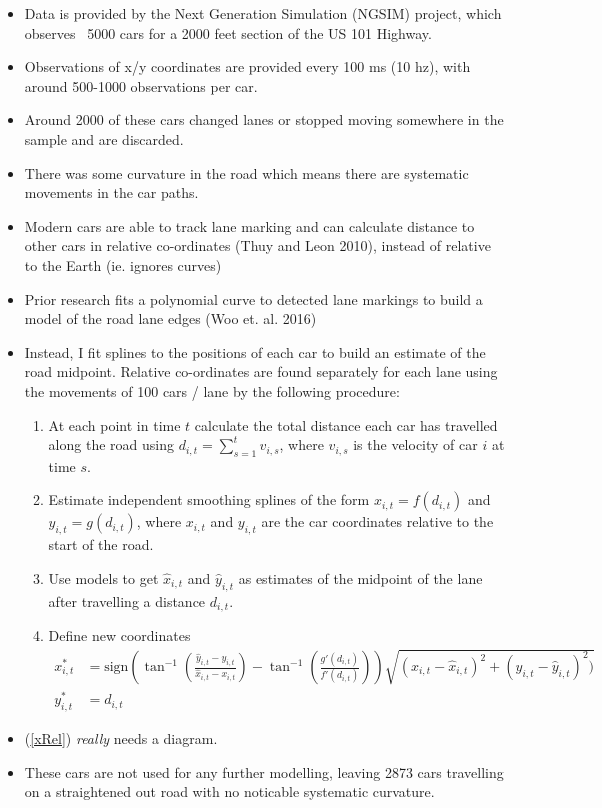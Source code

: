 \documentclass[12pt,a4paper]{article}\usepackage[]{graphicx}\usepackage[]{color}
\begin{document}
\begin{itemize}
\item Data is provided by the Next Generation Simulation (NGSIM) project, which observes ~5000 cars for a 2000 feet section of the US 101 Highway.
\item Observations of x/y coordinates are provided every 100 ms (10 hz), with around 500-1000 observations per car.
\item Around 2000 of these cars changed lanes or stopped moving somewhere in the sample and are discarded.
\item There was some curvature in the road which means there are systematic movements in the car paths.
\item Modern cars are able to track lane marking and can calculate distance to other cars in relative co-ordinates (Thuy and Leon 2010), instead of relative to the Earth (ie. ignores curves)
\item Prior research fits a polynomial curve to detected lane markings to build a model of the road lane edges (Woo et. al. 2016) 
\item Instead, I fit splines to the positions of each car to build an estimate of the road midpoint. Relative co-ordinates are found separately for each lane using the movements of 100 cars / lane by the following procedure:
\begin{enumerate}
\item At each point in time $t$ calculate the total distance each car has travelled along the road using $d_{i, t} = \sum_{s=1}^t v_{i, s}$, where $v_{i, s}$ is the velocity of car $i$ at time $s$. 
\item Estimate independent smoothing splines of the form $x_{i, t} = f(d_{i, t})$ and $y_{i, t} = g(d_{i, t})$, where $x_{i, t}$ and $y_{i, t}$ are the car coordinates relative to the start of the road.
\item Use models to get $\hat{x}_{i, t}$ and $\hat{y}_{i, t}$ as estimates of the midpoint of the lane after travelling a distance $d_{i, t}$.
\item Define new coordinates 
\begin{align}
x^*_{i, t} &= \mbox{sign}\left(\tan^{-1}\left(\frac{\hat{y}_{i, t} - y_{i, t}}{\hat{x}_{i, t} - x_{i, t}} \right) - \tan^{-1}\left(\frac{g'(d_{i, t}) }{f'(d_{i, t})}\right)\right)\sqrt{(x_{i, t}-\hat{x}_{i, t})^2 + (y_{i, t} - \hat{y}_{i, t})^2)} \label{xRel} \\
y^*_{i, t} &= d_{i, t} \label{yRel}
\end{align}
\end{enumerate}
\item (\ref{xRel}) \textit{really} needs a diagram.
\item These cars are not used for any further modelling, leaving 2873 cars travelling on a straightened out road with no noticable systematic curvature.
\end{itemize}
\end{document}
